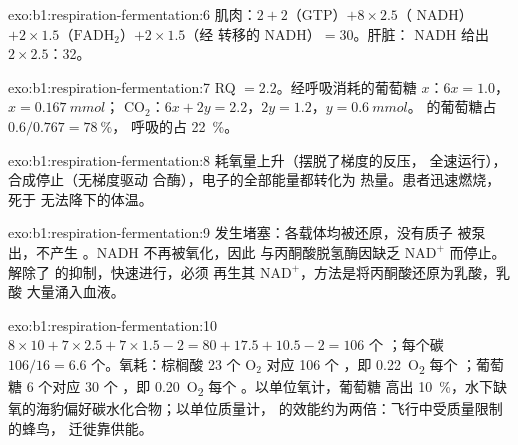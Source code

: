 \begin{solution}{exo:b1:respiration-fermentation:6}
肌肉：$2 + 2$（GTP）$+ 8\times 2.5$（ NADH）$+ 2\times
1.5$（$\mathrm{FADH_2}$）$+ 2\times 1.5$（经  转移的 NADH）$=
30$。肝脏： NADH 给出 $2\times 2.5$：32。
\end{solution}

\begin{solution}{exo:b1:respiration-fermentation:7}
RQ $= 2.2$。经呼吸消耗的葡萄糖 $x$：$6x = 1.0$，$x = \qty{0.167}{mmol}$；
$\mathrm{CO_2}$：$6x + 2y = 2.2$，$2y = 1.2$，$y = \qty{0.6}{mmol}$。
的葡萄糖占 $0.6/0.767 = \qty{78}{\%}$，
呼吸的占 \qty{22}{\%}。
\end{solution}

\begin{solution}{exo:b1:respiration-fermentation:8}
耗氧量上升（摆脱了梯度的反压，
全速运行）， 合成停止（无梯度驱动
合酶），电子的全部能量都转化为
热量。患者迅速燃烧，死于
无法降下的体温。
\end{solution}

\begin{solution}{exo:b1:respiration-fermentation:9}
发生堵塞：各载体均被还原，没有质子
被泵出，不产生 。NADH 不再被氧化，因此
与丙酮酸脱氢酶因缺乏 $\mathrm{NAD^+}$ 而停止。
解除了  的抑制，快速进行，必须
再生其 $\mathrm{NAD^+}$，方法是将丙酮酸还原为乳酸，乳酸
大量涌入血液。
\end{solution}

\begin{solution}{exo:b1:respiration-fermentation:10}
$8\times 10 + 7\times 2.5 + 7\times 1.5 - 2 = 80 + 17.5 + 10.5 - 2 =
106$ 个 ；每个碳 $106/16 = 6.6$ 个。氧耗：棕榈酸 23
个 $\mathrm{O_2}$ 对应 106 个 ，即 \qty{0.22}{O_2} 每个 ；葡萄糖 6 个对应 30
个 ，即 \qty{0.20}{O_2} 每个 。以单位氧计，葡萄糖
高出 \qty{10}{\%}，水下缺氧的海豹偏好碳水化合物；以单位质量计，
的效能约为两倍：飞行中受质量限制的蜂鸟，
迁徙靠供能。
\end{solution}

